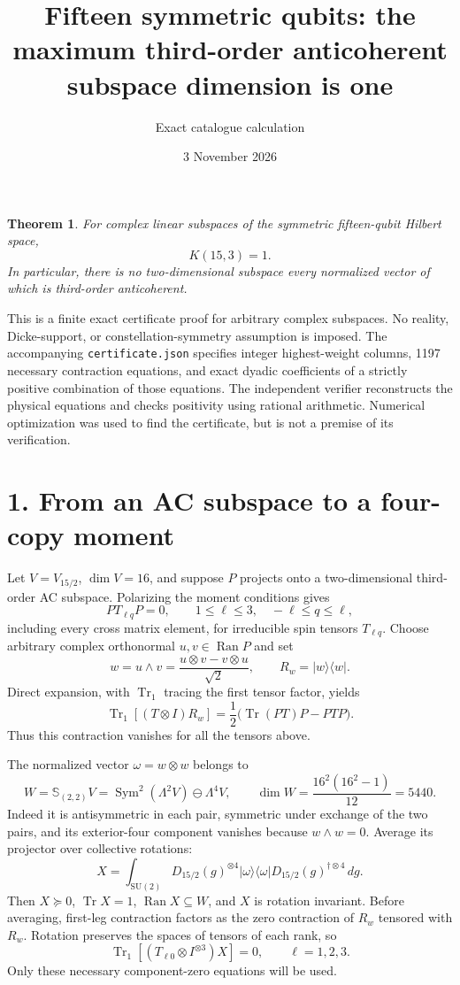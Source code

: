\documentclass[11pt]{article}
\newtheorem{theorem}{Theorem}
\newcommand{\Tr}{\operatorname{Tr}}
\newcommand{\Sym}{\operatorname{Sym}}
\begin{document}
\title{Fifteen symmetric qubits: the maximum third-order anticoherent subspace dimension is one}
\author{Exact catalogue calculation}
\date{3 November 2026}
\maketitle
\begin{theorem}
For complex linear subspaces of the symmetric fifteen-qubit Hilbert space,
\[
 \boxed{K(15,3)=1.}
\]
In particular, there is no two-dimensional subspace every normalized vector of which is third-order anticoherent.
\end{theorem}
This is a finite exact certificate proof for arbitrary complex subspaces. No reality, Dicke-support, or constellation-symmetry assumption is imposed. The accompanying \texttt{certificate.json} specifies integer highest-weight columns, 1197 necessary contraction equations, and exact dyadic coefficients of a strictly positive combination of those equations. The independent verifier reconstructs the physical equations and checks positivity using rational arithmetic. Numerical optimization was used to find the certificate, but is not a premise of its verification.

\section*{1. From an AC subspace to a four-copy moment}
Let $V=V_{15/2}$, $\dim V=16$, and suppose $P$ projects onto a two-dimensional third-order AC subspace. Polarizing the moment conditions gives
\[
 PT_{\ell q}P=0,\qquad 1\le\ell\le3,\quad -\ell\le q\le\ell,
\]
including every cross matrix element, for irreducible spin tensors $T_{\ell q}$.
Choose arbitrary complex orthonormal $u,v\in\operatorname{Ran}P$ and set
\[
 w=u\wedge v=\frac{u\otimes v-v\otimes u}{\sqrt2},
 \qquad R_w=|w\rangle\langle w|.
\]
Direct expansion, with $\Tr_1$ tracing the first tensor factor, yields
\[
 \Tr_1[(T\otimes I)R_w]
 =\frac12\bigl(\Tr(PT)P-PTP\bigr).
\]
Thus this contraction vanishes for all the tensors above.

The normalized vector $\omega=w\otimes w$ belongs to
\[
 W=\mathbb S_{(2,2)}V
 =\Sym^2(\Lambda^2V)\ominus\Lambda^4V,
 \qquad \dim W=\frac{16^2(16^2-1)}{12}=5440.
\]
Indeed it is antisymmetric in each pair, symmetric under exchange of the two pairs, and its exterior-four component vanishes because $w\wedge w=0$. Average its projector over collective rotations:
\[
 X=\int_{\mathrm{SU}(2)}D_{15/2}(g)^{\otimes4}
 |\omega\rangle\langle\omega|
 D_{15/2}(g)^{\dagger\otimes4}\,dg.
\]
Then $X\succeq0$, $\Tr X=1$, $\operatorname{Ran}X\subseteq W$, and $X$ is rotation invariant. Before averaging, first-leg contraction factors as the zero contraction of $R_w$ tensored with $R_w$. Rotation preserves the spaces of tensors of each rank, so
\begin{equation}\label{eq:contraction}
 \Tr_1[(T_{\ell0}\otimes I^{\otimes3})X]=0,
 \qquad\ell=1,2,3.
\end{equation}
Only these necessary component-zero equations will be used.
\end{document}
